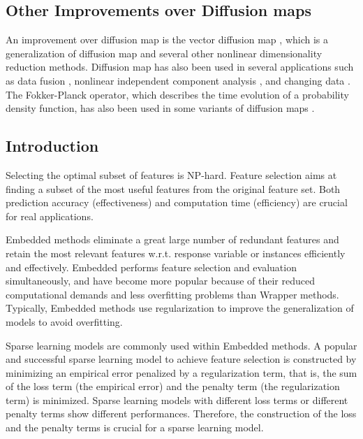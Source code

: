 \documentclass[lang=cn,10pt]{gorgeousnbook}
\numberwithin{equation}{section}%
\numberwithin{figure}{section}%
\begin{document}
\subsection{Other Improvements over Diffusion maps}

An improvement over diffusion map is the vector diffusion map \cite{singer2012vector}, which is a generalization of diffusion map and several other nonlinear dimensionality reduction methods. 
Diffusion map has also been used in several applications such as data fusion \cite{lafon2006data}, nonlinear independent component analysis \cite{singer2008non}, and changing data \cite{coifman2014diffusion}. 
The Fokker-Planck operator, which describes the time evolution of a probability density function, has also been used in some variants of diffusion maps \cite{nadler2005diffusion}. 



\subsection{Introduction}

Selecting the optimal subset of features is NP-hard. Feature selection aims at finding a subset of the most useful features from the original feature set. Both prediction accuracy (effectiveness) and computation time (efficiency) are crucial for real applications. 

Embedded methods eliminate a great large number of redundant features and retain the most relevant features w.r.t. response variable or instances efficiently and effectively. Embedded performs feature selection and evaluation simultaneously, and have become more popular because of their reduced computational demands and less overfitting problems than Wrapper methods. Typically, Embedded methods use regularization to improve the generalization of models to avoid overfitting. 

Sparse learning models are commonly used within Embedded methods. A popular and successful sparse learning model to
achieve feature selection is constructed by minimizing an empirical error penalized by a regularization term, that is, the
sum of the loss term (the empirical error) and the penalty term (the regularization term) is minimized. Sparse learning
models with different loss terms or different penalty terms show different performances. Therefore, the construction of the loss and the penalty terms is crucial for a sparse learning model.
\end{document}
